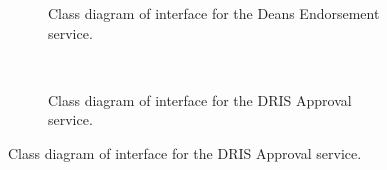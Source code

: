 \documentclass[12pt]{article}
\begin{document}
\begin{figure}[H]
\begin{subfigure}[p]{0.47\textwidth}
\centering	
{}
\caption{Class diagram of interface for the Deans Endorsement service.}
\end{subfigure}
~
\begin{subfigure}[p]{0.47\textwidth}
\centering	
{}
\caption{Class diagram of interface for the DRIS Approval service.}
\end{subfigure}
\end{figure}
\end{document}
